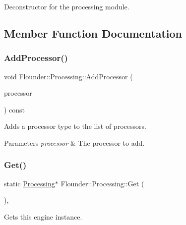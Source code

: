 Deconstructor for the processing module. 



\subsection{Member Function Documentation}
\mbox{\label{class_flounder_1_1_processing_a9eef3faedd110d7bbbd125addce19430}} 
\subsubsection{\texorpdfstring{Add\+Processor()}{AddProcessor()}}
{\footnotesize\ttfamily void Flounder\+::\+Processing\+::\+Add\+Processor (\begin{DoxyParamCaption}\item[{\hyperlink{class_flounder_1_1_i_processor}{I\+Processor} $\ast$}]{processor }\end{DoxyParamCaption}) const}



Adds a processor type to the list of processors. 


\begin{DoxyParams}{Parameters}
{\em processor} & The processor to add. \\
\hline
\end{DoxyParams}
\mbox{\label{class_flounder_1_1_processing_a14b3117c1ff8cb8436f2ddb8e7097e51}} 
\subsubsection{\texorpdfstring{Get()}{Get()}}
{\footnotesize\ttfamily static \hyperlink{class_flounder_1_1_processing}{Processing}$\ast$ Flounder\+::\+Processing\+::\+Get (\begin{DoxyParamCaption}{ }\end{DoxyParamCaption})\hspace{0.3cm}{\ttfamily [inline]}, {\ttfamily [static]}}



Gets this engine instance. 

